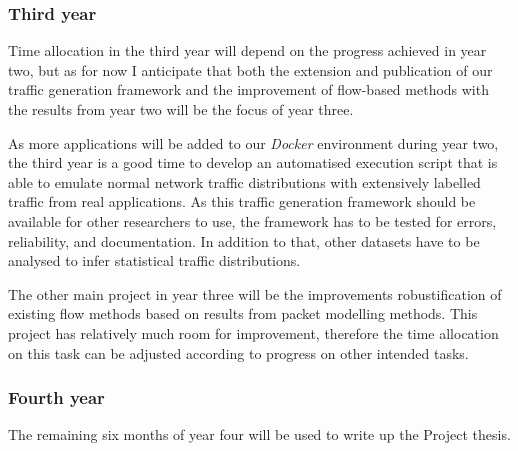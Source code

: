 \documentclass[a4paper,12pt,twoside]{report}
\begin{document}
\subsubsection{Third year}

Time allocation in the third year will depend on the progress achieved in year two, but as for now I anticipate that both the extension and publication of our traffic generation framework and the improvement of flow-based methods with the results from year two will be the focus of year three. 

As more applications will be added to our \textit{Docker} environment during year two, the third year is a good time to develop an automatised execution script that is able to emulate normal network traffic distributions with extensively labelled traffic from real applications. As this traffic generation framework should be available for other researchers to use, the framework has to be tested for errors, reliability, and documentation. In addition to that, other datasets have to be analysed to infer statistical traffic distributions. 

The other main project in year three will be the improvements robustification of existing flow methods based on results from packet modelling methods. This project has relatively much room for improvement, therefore the time allocation on this task can be adjusted according to progress on other intended tasks.

\subsubsection{Fourth year}

The remaining six months of year four will be used to write up the Project thesis. 







\end{document}
